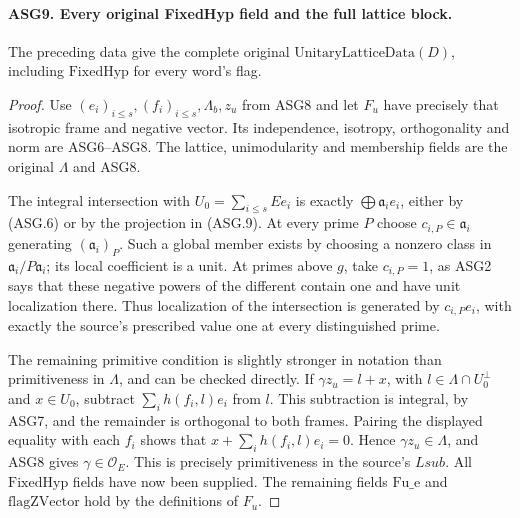 \paragraph{ASG9. Every original FixedHyp field and the full lattice block.}
\label{claim:ASG9}
The preceding data give the complete original
\(\mathrm{UnitaryLatticeData}(D)\), including
\(\mathrm{FixedHyp}\) for every word's flag.
\begin{proof}
Use \((e_i)_{i\le s},(f_i)_{i\le s},\Lambda_b,z_u\) from
ASG8 and let \(F_u\) have precisely that isotropic frame and
negative vector.  Its independence, isotropy, orthogonality and norm
are ASG6--ASG8.  The lattice, unimodularity and membership fields are
the original \(\Lambda\) and ASG8.

The integral intersection with \(U_0=\sum_{i\le s}Ee_i\)
is exactly \(\bigoplus\mathfrak a_i e_i\), either by (ASG.6)
or by the projection in (ASG.9).  At every prime \(P\) choose
\(c_{i,P}\in\mathfrak a_i\) generating
\((\mathfrak a_i)_P\).  Such a global member exists by choosing
a nonzero class in \(\mathfrak a_i/P\mathfrak a_i\); its
local coefficient is a unit.  At primes above \(g\), take
\(c_{i,P}=1\), as ASG2 says that these negative powers of the
different contain one and have unit localization there.
Thus localization of the intersection is generated by
\(c_{i,P}e_i\), with exactly the source's prescribed value one
at every distinguished prime.

The remaining primitive condition is slightly stronger in notation
than primitiveness in \(\Lambda\), and can be checked directly.
If \(\gamma z_u=l+x\), with
\(l\in\Lambda\cap U_0^\perp\) and \(x\in U_0\), subtract
\(\sum_i h(f_i,l)e_i\) from \(l\).  This subtraction is
integral, by ASG7, and the remainder is orthogonal to both frames.
Pairing the displayed equality with each \(f_i\) shows that
\(x+\sum_i h(f_i,l)e_i=0\).  Hence \(\gamma z_u\in\Lambda\),
and ASG8 gives \(\gamma\in\mathcal O_E\).
This is precisely primitiveness in the source's \(Lsub\).
All \(\mathrm{FixedHyp}\) fields have now been supplied.
The remaining fields \(\mathrm{Fu\_e}\) and
\(\mathrm{flagZVector}\) hold by the definitions of \(F_u\).
\end{proof}

